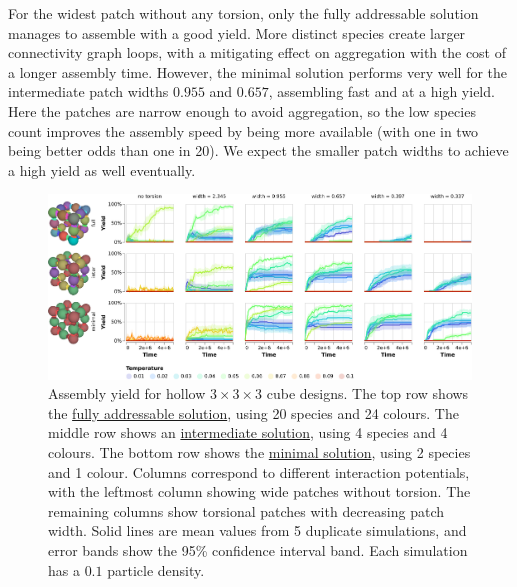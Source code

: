 
For the widest patch without any torsion, only the fully addressable solution manages to assemble with a good yield. More distinct species create larger connectivity graph loops, with a mitigating effect on aggregation with the cost of a longer assembly time. However, the minimal solution performs very well for the intermediate patch widths \(0.955\) and \(0.657\), assembling fast and at a high yield. Here the patches are narrow enough to avoid aggregation, so the low species count improves the assembly speed by being more available (with one in two being better odds than one in 20). We expect the smaller patch widths to achieve a high yield as well eventually.


\begin{figure}[h]
    \centering
    \includegraphics[width=\linewidth]{figures/patchysim/cubePotentials.eps}
    \caption{Assembly yield for hollow \(3 \times 3 \times 3\) cube designs. The top row shows the \href{https://akodiat.github.io/polycubes/?assemblyMode=stochastic&rule=00040109020c000089110200001491010218000001018e1c002001259e000000a5290200002ca901b200000001019a30963401010200863801010200ba00013d02400000bd450200b600c5010248ae4c01010200ce00e101d20000000101ca5000000101c254de000159d600a25c010102000000d9610200}{fully addressable solution}, using 20 species and 24 colours. The middle row shows an \href{https://akodiat.github.io/polycubes/?assemblyMode=stochastic&rule=90000800000600040090000d000000008b8d000011860000}{intermediate solution}, using 4 species and 4 colours. The bottom row shows the \href{https://akodiat.github.io/polycubes/?assemblyMode=stochastic&rule=070000070500868700000000}{minimal solution}, using 2 species and 1 colour. Columns correspond to different interaction potentials, with the leftmost column showing wide patches without torsion. The remaining columns show torsional patches with decreasing patch width. Solid lines are mean values from 5 duplicate simulations, and error bands show the 95\% confidence interval band. Each simulation has a \(0.1\) particle density.}
    \label{fig:cubePotentials}
\end{figure}

